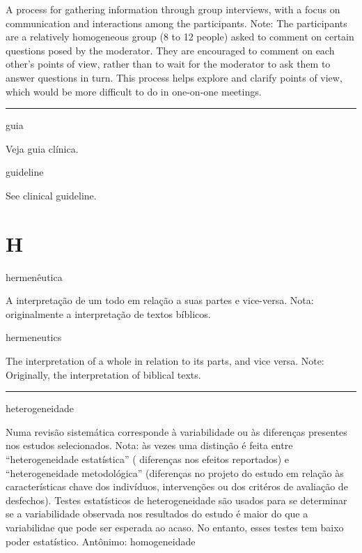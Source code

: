 \documentclass[
  openany]{book}
\begin{document}
A process for gathering information through group interviews, with a focus on communication and interactions among the participants. Note: The participants are a relatively homogeneous group (8 to 12 people) asked to comment on certain questions posed by the moderator. They are encouraged to comment on each other's points of view, rather than to wait for the moderator to ask them to answer questions in turn. This process helps explore and clarify points of view, which would be more difficult to do in one-on-one meetings.

\begin{center}\rule{0.5\linewidth}{0.5pt}\end{center}

guia

Veja guia clínica.

guideline

See clinical guideline.

\hypertarget{h}{%
\chapter*{H}\label{h}}

hermenêutica

A interpretação de um todo em relação a suas partes e vice-versa. Nota: originalmente a interpretação de textos bíblicos.

hermeneutics

The interpretation of a whole in relation to its parts, and vice versa. Note: Originally, the interpretation of biblical texts.

\begin{center}\rule{0.5\linewidth}{0.5pt}\end{center}

heterogeneidade

Numa revisão sistemática corresponde à variabilidade ou às diferenças presentes nos estudos selecionados. Nota: às vezes uma distinção é feita entre ``heterogeneidade estatística'' ( diferenças nos efeitos reportados) e ``heterogeneidade metodológica'' (diferenças no projeto do estudo em relação às características chave dos indivíduos, intervenções ou dos critéros de avaliação de desfechos). Testes estatísticos de heterogeneidade são usados para se determinar se a variabilidade observada nos resultados do estudo é maior do que a variabilidae que pode ser esperada ao acaso. No entanto, esses testes tem baixo poder estatístico. Antônimo: homogeneidade
\end{document}

